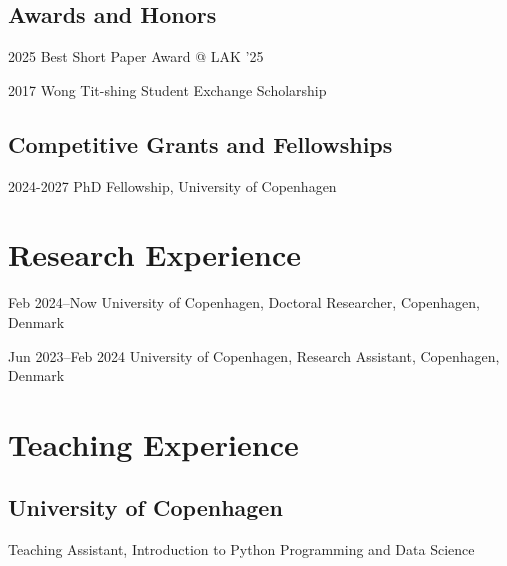 \documentclass[11pt,letterpaper]{report}
\newcommand{\listitemspace}{0.25em}
\renewenvironment{itemize}
{\begin{list}{}{\setlength{\leftmargin}{0em}
                \setlength{\parskip}{0em}
                \setlength{\itemsep}{\listitemspace}
                \setlength{\parsep}{\listitemspace}}}
{\end{list}}
\begin{document}
    \subsection*{Awards and Honors}

    \begin{tablist}
        \item[2025] \tab{}Best Short Paper Award @ LAK '25
        \item[2017] \tab{}Wong Tit-shing Student Exchange Scholarship
    \end{tablist}

    \subsection*{Competitive Grants and Fellowships}

    \begin{tablist}

        \item[2024-2027] \tab{}PhD Fellowship, University of Copenhagen

    \end{tablist}

    \section*{Research Experience}
    
    \begin{tablist}

        \item[Feb 2024--Now ] \tab{}University of Copenhagen, Doctoral Researcher, Copenhagen, Denmark
        \item[Jun 2023--Feb 2024] \tab{}University of Copenhagen, Research Assistant, Copenhagen, Denmark

    \end{tablist}

    \section*{Teaching Experience}

    \subsection*{University of Copenhagen}

    \begin{itemize}

        \item Teaching Assistant, Introduction to Python Programming and Data Science

    \end{itemize}
\end{document}
